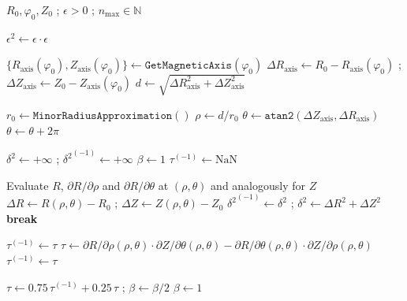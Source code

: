 \begin{algorithm}
  \caption{Inverse Coordinate Transform $(R_0, \varphi_0, Z_0) \to (\rho, \theta, \varphi_0)$ with extrapolation}
  \begin{algorithmic}[1]
    \Require
      $R_0, \varphi_0, Z_0$ ; $\epsilon > 0$ ; $n_\textrm{max} \in \mathbb{N}$

    \State $\epsilon^2 \gets \epsilon \cdot \epsilon$

    \State $\{ R_\textrm{axis}(\varphi_0), Z_\textrm{axis}(\varphi_0) \} \gets \texttt{GetMagneticAxis}(\varphi_0)$
    \State $\Delta R_\textrm{axis} \gets R_0 - R_\textrm{axis}(\varphi_0)$ ; $\Delta Z_\textrm{axis} \gets Z_0 - Z_\textrm{axis}(\varphi_0)$
    \State $d \gets \sqrt{\Delta R_\textrm{axis}^2 + \Delta Z_\textrm{axis}^2}$

    \State $r_0 \gets \texttt{MinorRadiusApproximation}()$
    \State $ \rho \gets d / r_0$
    \State $\theta \gets \texttt{atan2}(\Delta Z_\textrm{axis}, \Delta R_\textrm{axis})$
      \State $\theta \gets \theta + 2\pi$
    \EndIf

    \State $\delta^2 \gets +\infty$ ; ${\delta^2}^{(-1)} \gets +\infty$
    \State $\beta \gets 1$
    \State $\tau^{(-1)} \gets \textrm{NaN}$


      \State Evaluate $R$, $\partial R / \partial \rho$ and $\partial R / \partial \theta$ at $(\rho, \theta)$ and analogously for $Z$
      \State $\Delta R \gets R(\rho, \theta) - R_0$ ; $\Delta Z \gets Z(\rho, \theta) - Z_0$
      \State ${\delta^2}^{(-1)} \gets \delta^2$ ; $\delta^2 \gets \Delta R^2 + \Delta Z^2$
        \State \textbf{break}
      \EndIf

      \State $\tau^{(-1)} \gets \tau$
      \State $\tau \gets \partial R / \partial \rho (\rho, \theta) \cdot \partial Z / \partial \theta (\rho, \theta) - \partial R / \partial \theta (\rho, \theta) \cdot \partial Z / \partial \rho (\rho, \theta)$
        \State $\tau^{(-1)} \gets \tau$
      \EndIf

        \State $\tau \gets 0.75\,\tau^{(-1)} + 0.25\,\tau$ ; $\beta \gets \beta/2$
      \Else
        \State $\beta \gets 1$
      \EndIf


\end{algorithmic}
\end{algorithm}

